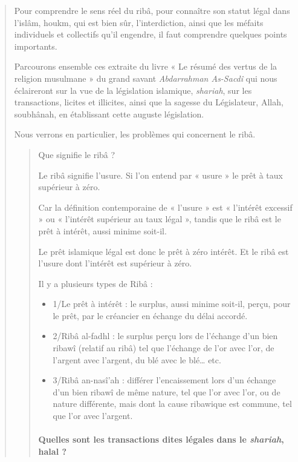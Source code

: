  \begin{quote}
    


Pour comprendre le sens réel du ribâ, pour connaître son statut légal dans l’islâm, houkm, qui est bien sûr, l’interdiction, ainsi que les méfaits individuels et collectifs qu’il engendre, il faut comprendre quelques points importants.

Parcourons ensemble ces extraite du livre « Le résumé des vertus de la religion musulmane » du grand savant \textit{Abdarrahman As-Sacdî} qui nous éclaireront sur la vue de la législation islamique, \emph{shariah}, sur les transactions, licites et illicites, ainsi que la sagesse du Législateur, Allah, soubhânah, en établissant cette auguste législation.

Nous verrons en particulier, les problèmes qui concernent le ribâ.

\begin{quote}
    
Que signifie le ribâ ?

Le ribâ signifie l’usure. Si l’on entend par « usure » le prêt à taux supérieur à zéro.

Car la définition contemporaine de « l’usure » est « l’intérêt excessif » ou « l’intérêt supérieur au taux légal », tandis que le ribâ est le prêt à intérêt, aussi minime soit-il.

Le prêt islamique légal est donc le prêt à zéro intérêt. Et le ribâ est l’usure dont l’intérêt est supérieur à zéro.

Il y a plusieurs types de Ribâ :
\begin{itemize}
    \item 1/Le prêt à intérêt : le surplus, aussi minime soit-il, perçu, pour le prêt, par le créancier en échange du délai accordé.

 \item 2/Ribâ al-fadhl : le surplus perçu lors de l’échange d’un bien ribawî (relatif au ribâ) tel que l’échange de l’or avec l’or, de l’argent avec l’argent, du blé avec le blé… etc.

 \item 3/Ribâ an-nasî’ah : différer l’encaissement lors d’un échange d’un bien ribawî de même nature, tel que l’or avec l’or, ou de nature différente, mais dont la cause ribawique est commune, tel que l’or avec l’argent.
\end{itemize}


\paragraph{Quelles sont les transactions dites légales dans le \emph{shariah}, halal ?}


\end{quote}
\end{quote}
